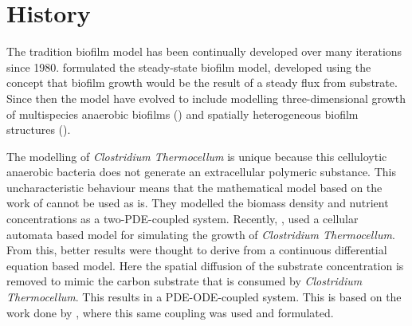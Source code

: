\section{History}


The tradition biofilm model has been continually developed over many iterations since 1980.
\cite{rittmann1980model} formulated the steady-state biofilm model, developed using the concept that biofilm growth would be the result of a steady flux from substrate.
Since then the model have evolved to include modelling three-dimensional growth of multispecies anaerobic biofilms (\cite{noguera1999simulation}) and spatially heterogeneous biofilm structures (\cite{eberl2001deterministic}). 

The modelling of \textit{Clostridium Thermocellum} is unique because this celluloytic anaerobic bacteria does not generate an extracellular polymeric substance.
This uncharacteristic behaviour means that the mathematical model based on the work of \cite{eberl2007finite} cannot be used as is. 
They modelled the biomass density and nutrient concentrations as a two-PDE-coupled system.
Recently, \cite{wang2011spatial}, used a cellular automata based model for simulating the growth of \textit{Clostridium Thermocellum}. From this, better results were thought to derive from a continuous differential equation based model.
Here the spatial diffusion of the substrate concentration is removed to mimic the carbon substrate that is consumed by \textit{Clostridium Thermocellum}. This results in a PDE-ODE-coupled system.
This is based on the work done by \cite{dumitrache2014understanding}, where this same coupling was used and formulated.
